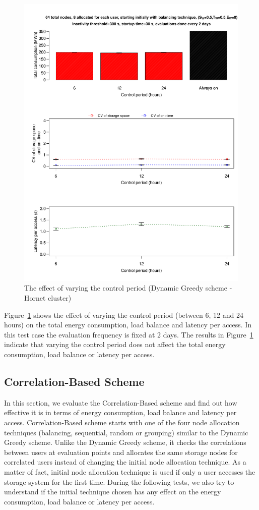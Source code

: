 \documentclass[preprint,12pt]{elsarticle}
\begin{document}
\begin{figure}[!htbp]
\centering
\includegraphics[width=\columnwidth,keepaspectratio]{FIG11.pdf}
\caption{The effect of varying the control period (Dynamic Greedy scheme - Hornet cluster)}
\label{sixthresult}
\end{figure}

Figure~\ref{sixthresult} shows the effect of varying the control period (between 6, 12 and 24 hours)
on the total energy consumption, load balance and latency per access. In this test case the evaluation
frequency is fixed at 2 days. The results in Figure~\ref{sixthresult} indicate that varying the control
period does not affect the total energy consumption, load balance or latency per access.

\subsection{Correlation-Based Scheme}
In this section, we evaluate the Correlation-Based scheme and find out how effective it is in terms of energy consumption,
load balance and latency per access. Correlation-Based scheme starts with one of the four node allocation
techniques (balancing, sequential, random or grouping) similar to the Dynamic Greedy scheme. Unlike the Dynamic
Greedy scheme, it checks the correlations between users at evaluation points and allocates the same storage
nodes for correlated users instead of changing the initial node allocation technique. As a matter of fact,
initial node allocation technique is used if only a user accesses the storage system for the first time.
During the following tests, we also try to understand if the initial technique chosen has any effect on the
energy consumption, load balance or latency per access.
\end{document}
